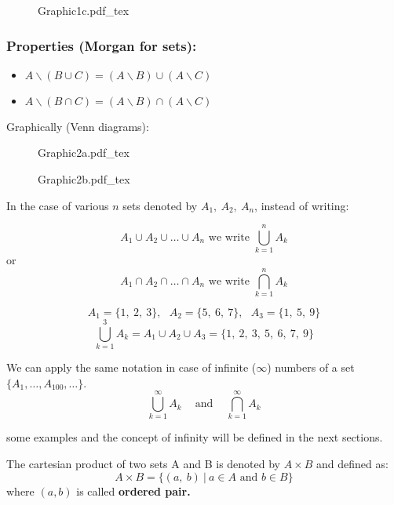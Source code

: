\documentclass[12pt, a4paper]{book}
\newcommand{\incfig}[1]{%
\def\svgscale{1}
{#1.pdf_tex}
}
\begin{document}
\begin{figure}[H]
  \centering
  \incfig{Graphic1c}
\end{figure}

\subsubsection*{Properties (Morgan for sets): }

\begin{itemize}
  \item $A \backslash (B \cup C) = (A \backslash B) \cup (A \backslash C)$
  \item $A \backslash (B \cap C) = (A \backslash B) \cap (A \backslash C)$
\end{itemize}

Graphically (Venn diagrams):

\begin{figure}[H]
  \centering
  \incfig{Graphic2a}
\end{figure}

\begin{figure}[H]
  \centering
  \incfig{Graphic2b}
\end{figure}

\begin{note}
  In the case of various $n$ sets denoted by $A_1, \ A_2, \ A_n$, instead of writing:

  \[
    A_1 \cup A_2 \cup \ldots \cup A_n \text{ we write } \bigcup_{k=1}^{n} A_k
  \]
  or
  \[
    A_1 \cap A_2 \cap \ldots \cap A_n \text{ we write } \bigcap_{k=1}^{n} A_k
  \]
\end{note}

\begin{exmp}
  \[
    A_1=\{1, \ 2, \ 3 \}, \ \ \ A_2=\{ 5,\ 6, \ 7 \}, \ \ \ A_3= \{1, \ 5, \ 9 \}
  \]
  \[
    \bigcup_{k=1}^{3} A_k=A_1 \cup A_2 \cup A_3 = \{ 1, \ 2, \ 3, \ 5, \ 6, \ 7, \ 9 \}
  \]
\end{exmp}

\begin{rem}
We can apply the same notation in case of infinite ($\infty$) numbers of a set $\{ A_1, \ldots, A_{100}, \ldots \}$.
\[
  \displaystyle\bigcup_{k=1}^{\infty}A_k \ \ \ \ \text{ and } \ \ \ \ \displaystyle\bigcap_{k=1}^{\infty}A_k
\]
\end{rem}
some examples and the concept of infinity will be defined in the next sections.

\begin{defn}
  The cartesian product of two sets A and B is denoted by \boldmath $A \times B$  and defined as:
  \[
    A \times B = \{ (a, \ b  ) \ | \ a \in A \text{ and } b \in B \}
  \]
  \unboldmath
  where $(a, b)$ is called \textbf{ordered pair.} 
\end{defn}
\end{document}
